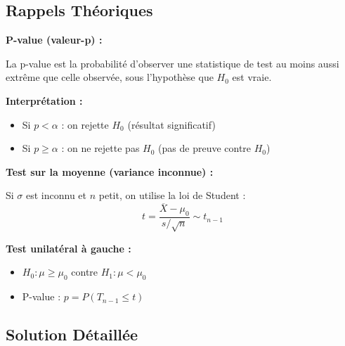 \documentclass[11pt,a4paper]{article}
\begin{document}
\subsection{Rappels Théoriques}

\begin{rappelbox}
\textbf{P-value (valeur-p) :}

La p-value est la probabilité d'observer une statistique de test au moins aussi extrême que celle observée, sous l'hypothèse que $H_0$ est vraie.

\textbf{Interprétation :}
\begin{itemize}
    \item Si $p < \alpha$ : on rejette $H_0$ (résultat significatif)
    \item Si $p \geq \alpha$ : on ne rejette pas $H_0$ (pas de preuve contre $H_0$)
\end{itemize}

\textbf{Test sur la moyenne (variance inconnue) :}

Si $\sigma$ est inconnu et $n$ petit, on utilise la loi de Student :
$$t = \frac{\overline{X} - \mu_0}{s/\sqrt{n}} \sim t_{n-1}$$

\textbf{Test unilatéral à gauche :}
\begin{itemize}
    \item $H_0 : \mu \geq \mu_0$ contre $H_1 : \mu < \mu_0$
    \item P-value : $p = P(T_{n-1} \leq t)$
\end{itemize}
\end{rappelbox}

\subsection{Solution Détaillée}
\end{document}

